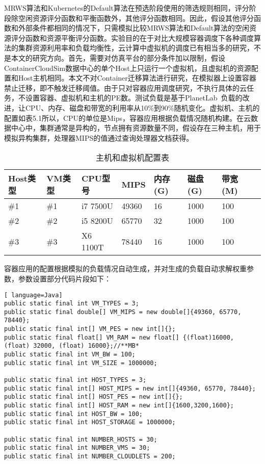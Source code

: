 MRWS算法和Kubernetes的Default算法在预选阶段使用的筛选规则相同，评分阶段除空闲资源评分函数和平衡函数外，其他评分函数相同。因此，假设其他评分函数和外部条件都相同的情况下，只需模拟比较MRWS算法和Default算法的空闲资源评分函数和资源平衡评分函数。实验目的在于对比大规模容器调度下各种调度算法的集群资源利用率和负载均衡性，云计算中虚拟机的调度已有相当多的研究，不是本文的研究方向。首先，需要对仿真平台的部分条件加以限制，假设ContainerCloudSim数据中心的单个Host上只运行一个虚拟机，且虚拟机的资源配置和Host主机相同。本文不对Container迁移算法进行研究，在模拟器上设置容器禁止迁移，即不触发迁移阈值。由于只对容器应用调度研究，不执行具体的云任务，不设置容器、虚拟机和主机的PE数。测试负载是基于PlanetLab~\cite{Park2006CoMon}负载的改进，让CPU、内存、磁盘和带宽的利用率从10\%到90\%随机变化。虚拟机、主机的配置如表5.1所以，CPU的单位是Mips，容器应用根据负载情况随机构建。在云数据中心中，集群通常是异构的，节点拥有资源数量不同，假设存在三种主机，用于模拟异构集群，处理器MIPS的值通过查询处理器文档获得。
\begin{table}[H]
	\centering\dawu[1.3]
	\caption{主机和虚拟机配置表}
	\begin{tabular}{|p{1.8cm}<{\centering}|p{1.5cm}<{\centering}|p{2cm}<{\centering}|p{1.5cm}<{\centering}|p{1.5cm}<{\centering}|p{1.5cm}<{\centering}|p{1.5cm}<{\centering}|p{1.5cm}<{\centering}|} \hline
		Host类型 & VM类型 & CPU型号 & MIPS & 内存(G) & 磁盘(G) & 带宽(M) \\ \hline
		\#1 & \#1 & i7 7500U & 49360 & 16 & 1000  & 100 \\ \hline
		\#2 & \#2 & i5 8200U & 65770 & 32 & 1000 & 100 \\ \hline
		\#3 & \#3 & X6 1100T & 78440 & 16 & 1000 & 100 \\ \hline
	\end{tabular}
\end{table}

容器应用的配置根据模拟的负载情况自动生成，并对生成的负载自动求解权重参数，参数设置部分代码片段如下：
\begin{lstlisting}[ language=Java]
public static final int VM_TYPES = 3;
public static final double[] VM_MIPS = new double[]{49360, 65770, 78440};
public static final int[] VM_PES = new int[]{};
public static final float[] VM_RAM = new float[] {(float)16000, (float) 32000, (float) 16000};//**MB*
public static final int VM_BW = 100;
public static final int VM_SIZE = 1000000;

public static final int HOST_TYPES = 3;
public static final int[] HOST_MIPS = new int[]{49360, 65770, 78440};
public static final int[] HOST_PES = new int[]{};
public static final int[] HOST_RAM = new int[]{1600,3200,1600};
public static final int HOST_BW = 100;
public static final int HOST_STORAGE = 1000000;

public static final int NUMBER_HOSTS = 30;
public static final int NUMBER_VMS = 30;
public static final int NUMBER_CLOUDLETS = 200;
\end{lstlisting}

